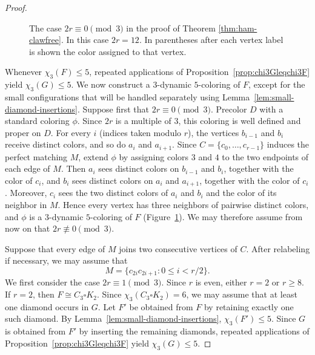 \documentclass[a4paper,11pt]{article}
\theoremstyle{case}
\numberwithin{subcase}{case}
\begin{document}
\begin{proof}
\begin{figure}[H]

    \caption{The case $2r\equiv0\pmod3$ in the proof of
    Theorem \ref{thm:ham-clawfree}. In this case $2r=12$.
    In parentheses after each vertex label is shown the color
    assigned to that vertex.}
    \label{fig:2requiv0mod3}
\end{figure}

Whenever $\chi_3(F)\leq5$, repeated applications of
Proposition~\ref{prop:chi3Gleqchi3F} yield $\chi_3(G)\leq5$.
We now construct a $3$-dynamic $5$-coloring of $F$, except for the
small configurations that will be handled separately using
Lemma~\ref{lem:small-diamond-insertions}.
Suppose first that $2r\equiv0\pmod3$. Precolor $D$ with a standard
coloring $\phi$. Since $2r$ is a multiple of $3$, this coloring is
well defined and proper on $D$. For every $i$ (indices taken modulo
$r$), the vertices $b_{i-1}$ and $b_i$ receive distinct colors, and
so do $a_i$ and $a_{i+1}$.
Since $C=\{c_0,\ldots,c_{r-1}\}$ induces the perfect matching $M$,
extend $\phi$ by assigning colors $3$ and $4$ to the two endpoints of
each edge of $M$. Then $a_i$ sees distinct colors on $b_{i-1}$ and
$b_i$, together with the color of $c_i$, and $b_i$ sees distinct
colors on $a_i$ and $a_{i+1}$, together with the color of $c_i$.
Moreover, $c_i$ sees the two distinct colors of $a_i$ and $b_i$ and
the color of its neighbor in $M$. Hence every vertex has three
neighbors of pairwise distinct colors, and $\phi$ is a $3$-dynamic
$5$-coloring of $F$ (Figure~\ref{fig:2requiv0mod3}).
We may therefore assume from now on that
$2r\not\equiv0\pmod3$.

Suppose that every edge of $M$ joins two consecutive vertices of $C$.
After relabeling if necessary, we may assume that
\[
M=\{c_{2i}c_{2i+1}:0\leq i<r/2\}.
\]
We first consider the case $2r\equiv1\pmod3$. Since $r$ is even, either
$r=2$ or $r\geq8$.
If $r=2$, then $F\cong C_3\square K_2$. Since
$\chi_3(C_3\square K_2)=6$, we may assume that at least one diamond occurs in $G$.
Let $F'$ be obtained from $F$ by retaining exactly one such diamond.
By Lemma~\ref{lem:small-diamond-insertions},
$\chi_3(F')\leq5$. Since $G$ is obtained from $F'$ by inserting the
remaining diamonds, repeated applications of
Proposition~\ref{prop:chi3Gleqchi3F} yield $\chi_3(G)\leq5$.


\end{proof}
\end{document}
